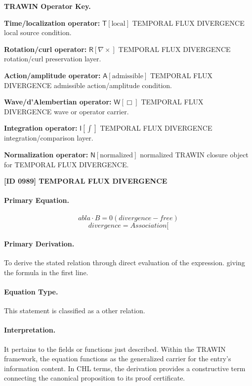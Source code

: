 \par\vspace{0.45\baselineskip}
\noindent\begin{minipage}[t]{\linewidth}
\begingroup
\small
\raggedright
\textbf{TRAWIN Operator Key.}\par
\noindent\textbf{Time/localization operator:} $\mathsf{T}\!\left[\mathrm{local}\right]$ TEMPORAL FLUX DIVERGENCE local source condition.\par
\noindent\textbf{Rotation/curl operator:} $\mathsf{R}\!\left[\nabla\times\right]$ TEMPORAL FLUX DIVERGENCE rotation/curl preservation layer.\par
\noindent\textbf{Action/amplitude operator:} $\mathsf{A}\!\left[\mathrm{admissible}\right]$ TEMPORAL FLUX DIVERGENCE admissible action/amplitude condition.\par
\noindent\textbf{Wave/d'Alembertian operator:} $\mathsf{W}\!\left[\Box\right]$ TEMPORAL FLUX DIVERGENCE wave or operator carrier.\par
\noindent\textbf{Integration operator:} $\mathsf{I}\!\left[\int\right]$ TEMPORAL FLUX DIVERGENCE integration/comparison layer.\par
\noindent\textbf{Normalization operator:} $\mathsf{N}\!\left[\mathrm{normalized}\right]$ normalized TRAWIN closure object for TEMPORAL FLUX DIVERGENCE.\par
\endgroup
\end{minipage}

\clearpage
\noindent\textbf{[ID 0989] TEMPORAL FLUX DIVERGENCE}\par
\vspace{0.35em}
\paragraph{Primary Equation.}
\[
abla \cdot B = 0 (divergence-free)
\]
\[
divergence = Association[
\]

\paragraph{Primary Derivation.}
To derive the stated relation through direct evaluation of the expression. giving the formula in the first line.
\paragraph{Equation Type.}
This statement is classified as a other relation.

\paragraph{Interpretation.}
It pertains to the fields or functions just described. Within the TRAWIN framework, the equation functions as the generalized carrier for the entry’s information content. In CHL terms, the derivation provides a constructive term connecting the canonical proposition to its proof certificate.


